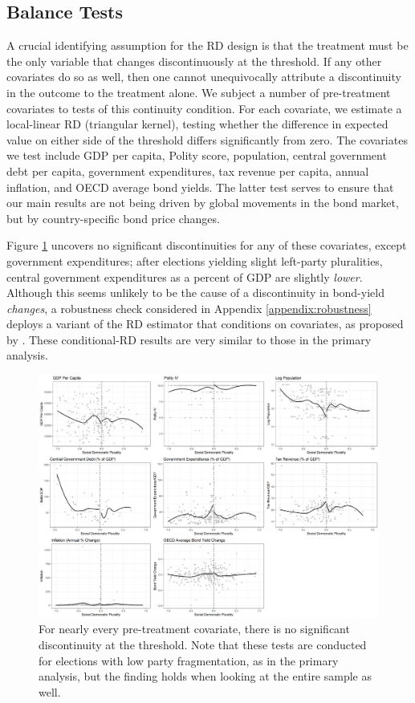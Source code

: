 \documentclass[12pt]{article}
\begin{document}
\subsection{Balance Tests}

A crucial identifying assumption for the RD design is that the treatment must be the only variable that changes discontinuously at the threshold. If any other covariates do so as well, then one cannot unequivocally attribute a discontinuity in the outcome to the treatment alone. We subject a number of pre-treatment covariates to tests of this continuity condition. For each covariate, we estimate a local-linear RD (triangular kernel), testing whether the difference in expected value on either side of the threshold differs significantly from zero. The covariates we test include GDP per capita, Polity score, population, central government debt per capita, government expenditures, tax revenue per capita, annual inflation, and OECD average bond yields. The latter test serves to ensure that our main results are not being driven by global movements in the bond market, but by country-specific bond price changes. 

Figure \ref{fig:balanceplots} uncovers no significant discontinuities for any of these covariates, except government expenditures; after elections yielding slight left-party pluralities, central government expenditures as a percent of GDP are slightly \textit{lower}. Although this seems unlikely to be the cause of a discontinuity in bond-yield \textit{changes}, a robustness check considered in Appendix \ref{appendix:robustness} deploys a variant of the RD estimator that conditions on covariates, as proposed by \citet{Calonico2018}. These conditional-RD results are very similar to those in the primary analysis.

\begin{figure}
\centering
\includegraphics[width=\linewidth]{figures/Figure3.png}
\caption{For nearly every pre-treatment covariate, there is no significant discontinuity at the threshold. Note that these tests are conducted for elections with low party fragmentation, as in the primary analysis, but the finding holds when looking at the entire sample as well.}
\label{fig:balanceplots}
\end{figure}
\end{document}
